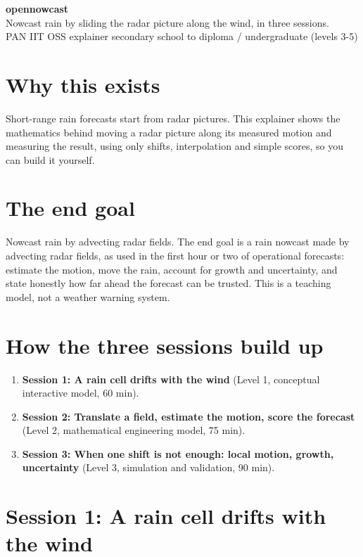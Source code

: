 \documentclass[11pt,a4paper]{article}
\begin{document}
\begin{center}{\LARGE\bfseries opennowcast}\\[0.4em]{\large Nowcast rain by sliding the radar picture along the wind, in three sessions.}\\[0.2em]\small PAN IIT OSS explainer \textbullet{} secondary school to diploma / undergraduate (levels 3-5)\end{center}

\section*{Why this exists}
Short-range rain forecasts start from radar pictures. This explainer shows the mathematics behind moving a radar picture along its measured motion and measuring the result, using only shifts, interpolation and simple scores, so you can build it yourself.

\section*{The end goal}
Nowcast rain by advecting radar fields. The end goal is a rain nowcast made by advecting radar fields, as used in the first hour or two of operational forecasts: estimate the motion, move the rain, account for growth and uncertainty, and state honestly how far ahead the forecast can be trusted. This is a teaching model, not a weather warning system.

\section*{How the three sessions build up}
\begin{enumerate}[nosep]
\item \textbf{Session 1: A rain cell drifts with the wind} (Level 1, conceptual interactive model, 60 min).
\item \textbf{Session 2: Translate a field, estimate the motion, score the forecast} (Level 2, mathematical engineering model, 75 min).
\item \textbf{Session 3: When one shift is not enough: local motion, growth, uncertainty} (Level 3, simulation and validation, 90 min).
\end{enumerate}

\section{Session 1: A rain cell drifts with the wind}
\end{document}
